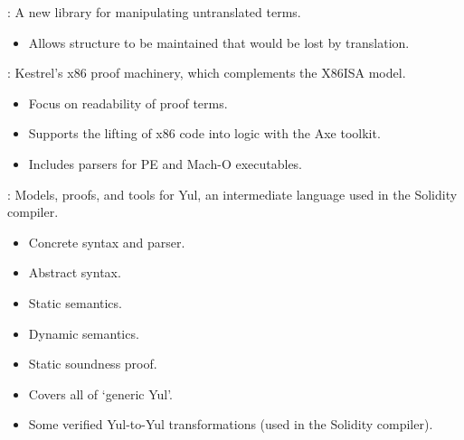 
\begin{frame}

\newlibtitle

:
A new library for manipulating untranslated terms.
\begin{itemize}
\item Allows structure to be maintained that would be lost by translation.
\end{itemize}

\end{frame}


\begin{frame}

\newlibtitle

:
Kestrel's x86 proof machinery, which complements the X86ISA model.
\begin{itemize}
\item Focus on readability of proof terms.
\item Supports the lifting of x86 code into logic with the Axe toolkit.
\item Includes parsers for PE and Mach-O executables.
\end{itemize}

\end{frame}


\begin{frame}

\newlibtitle

:
Models, proofs, and tools for Yul,
an intermediate language used in the Solidity compiler.
\begin{itemize}
\item Concrete syntax and parser.
\item Abstract syntax.
\item Static semantics.
\item Dynamic semantics.
\item Static soundness proof.
\item Covers all of `generic Yul'.
\item Some verified Yul-to-Yul transformations (used in the Solidity compiler).
\end{itemize}

\end{frame}

